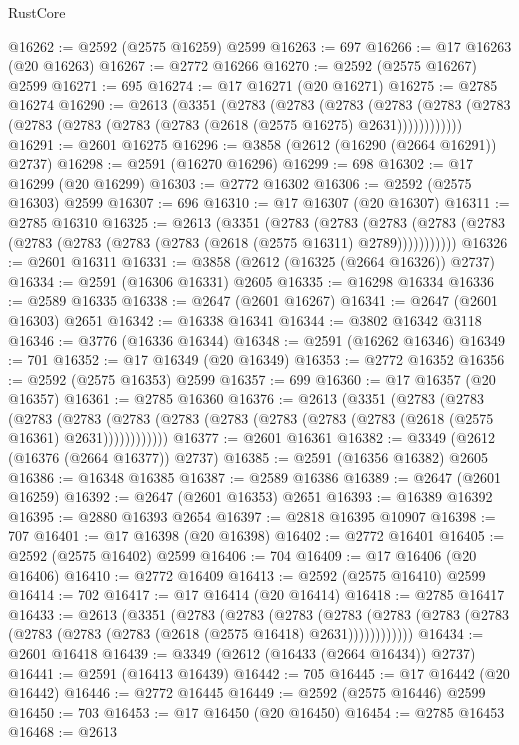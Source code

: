 \begin{lexlean}{RustCore}
\begin{coremodule}
@16262 := @2592 (@2575 @16259) @2599
@16263 := 697
@16266 := @17 @16263 (@20 @16263)
@16267 := @2772 @16266
@16270 := @2592 (@2575 @16267) @2599
@16271 := 695
@16274 := @17 @16271 (@20 @16271)
@16275 := @2785 @16274
@16290 := @2613
    (@3351
      (@2783
        (@2783
          (@2783
            (@2783 (@2783 (@2783 (@2783 (@2783 (@2783 (@2783 (@2618 (@2575 @16275) @2631))))))))))))
@16291 := @2601 @16275
@16296 := @3858 (@2612 (@16290 (@2664 @16291)) @2737)
@16298 := @2591 (@16270 @16296)
@16299 := 698
@16302 := @17 @16299 (@20 @16299)
@16303 := @2772 @16302
@16306 := @2592 (@2575 @16303) @2599
@16307 := 696
@16310 := @17 @16307 (@20 @16307)
@16311 := @2785 @16310
@16325 := @2613
    (@3351
      (@2783
        (@2783
          (@2783 (@2783 (@2783 (@2783 (@2783 (@2783 (@2783 (@2618 (@2575 @16311) @2789)))))))))))
@16326 := @2601 @16311
@16331 := @3858 (@2612 (@16325 (@2664 @16326)) @2737)
@16334 := @2591 (@16306 @16331) @2605
@16335 := @16298 @16334
@16336 := @2589 @16335
@16338 := @2647 (@2601 @16267)
@16341 := @2647 (@2601 @16303) @2651
@16342 := @16338 @16341
@16344 := @3802 @16342 @3118
@16346 := @3776 (@16336 @16344)
@16348 := @2591 (@16262 @16346)
@16349 := 701
@16352 := @17 @16349 (@20 @16349)
@16353 := @2772 @16352
@16356 := @2592 (@2575 @16353) @2599
@16357 := 699
@16360 := @17 @16357 (@20 @16357)
@16361 := @2785 @16360
@16376 := @2613
    (@3351
      (@2783
        (@2783
          (@2783
            (@2783 (@2783 (@2783 (@2783 (@2783 (@2783 (@2783 (@2618 (@2575 @16361) @2631))))))))))))
@16377 := @2601 @16361
@16382 := @3349 (@2612 (@16376 (@2664 @16377)) @2737)
@16385 := @2591 (@16356 @16382) @2605
@16386 := @16348 @16385
@16387 := @2589 @16386
@16389 := @2647 (@2601 @16259)
@16392 := @2647 (@2601 @16353) @2651
@16393 := @16389 @16392
@16395 := @2880 @16393 @2654
@16397 := @2818 @16395 @10907
@16398 := 707
@16401 := @17 @16398 (@20 @16398)
@16402 := @2772 @16401
@16405 := @2592 (@2575 @16402) @2599
@16406 := 704
@16409 := @17 @16406 (@20 @16406)
@16410 := @2772 @16409
@16413 := @2592 (@2575 @16410) @2599
@16414 := 702
@16417 := @17 @16414 (@20 @16414)
@16418 := @2785 @16417
@16433 := @2613
    (@3351
      (@2783
        (@2783
          (@2783
            (@2783 (@2783 (@2783 (@2783 (@2783 (@2783 (@2783 (@2618 (@2575 @16418) @2631))))))))))))
@16434 := @2601 @16418
@16439 := @3349 (@2612 (@16433 (@2664 @16434)) @2737)
@16441 := @2591 (@16413 @16439)
@16442 := 705
@16445 := @17 @16442 (@20 @16442)
@16446 := @2772 @16445
@16449 := @2592 (@2575 @16446) @2599
@16450 := 703
@16453 := @17 @16450 (@20 @16450)
@16454 := @2785 @16453
@16468 := @2613

\end{coremodule}
\end{lexlean}
